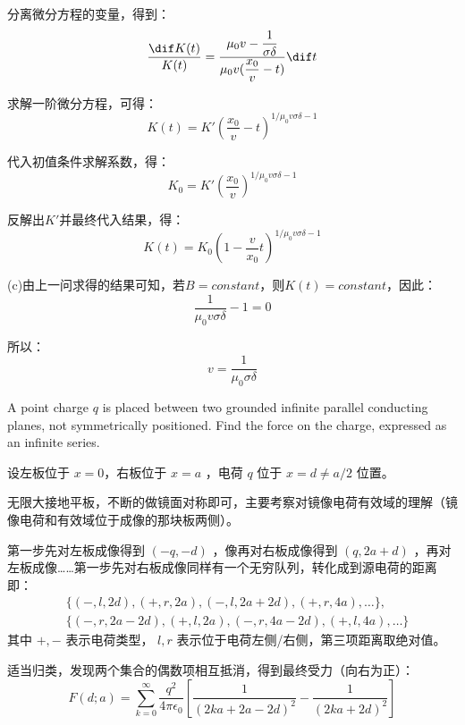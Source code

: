 \begin{solution}
    分离微分方程的变量，得到：
    \[\dfrac{\dif K(t)}{K(t)} = \dfrac{\mu_0 v - \dfrac{1}{\sigma \delta}}{\mu_0v(\dfrac{x_0}{v} - t)}\dif t\]

    求解一阶微分方程，可得：
    \[K(t) = K'(\dfrac{x_0}{v} - t)^{1/\mu_0 v \sigma\delta -1}\]

    代入初值条件求解系数，得：
    \[K_0 = K'(\dfrac{x_0}{v})^{1/\mu_0 v \sigma\delta -1}\]

    反解出$K'$并最终代入结果，得：
    \[K(t) = K_0(1-\dfrac{v}{x_0}t)^{1/\mu_0 v \sigma\delta -1}\]

    (c)由上一问求得的结果可知，若$B = constant$，则$K(t) = constant$，因此：
    \[\dfrac{1}{\mu_0 v \sigma\delta} - 1 = 0\]

    所以：
    \[v = \dfrac{1}{\mu_0 \sigma\delta}\]
\end{solution}

\begin{solution}
    A point charge \(q\) is placed between two grounded infinite parallel conducting planes, not symmetrically positioned. Find the force on the charge, expressed as an infinite series.
\tcbrule

    设左板位于 \(x=0\)，右板位于 \(x=a\) ，电荷 \(q\) 位于 \(x=d\neq a/2\) 位置。

    无限大接地平板，不断的做镜面对称即可，主要考察对镜像电荷有效域的理解（镜像电荷和有效域位于成像的那块板两侧）。

    第一步先对左板成像得到 \((-q,-d)\) ，像再对右板成像得到 \((q,2a+d)\) ，再对左板成像……第一步先对右板成像同样有一个无穷队列，转化成到源电荷的距离即：
    \begin{align}
    &\{(-,l,2d),(+,r,2a),(-,l,2a+2d),(+,r,4a),\dots\},\\
    &\{(-,r,2a-2d),(+,l,2a),(-,r,4a-2d),(+,l,4a),\dots\}
    \end{align}
    其中 \(+,-\) 表示电荷类型， \(l,r\) 表示位于电荷左侧/右侧，第三项距离取绝对值。

    适当归类，发现两个集合的偶数项相互抵消，得到最终受力（向右为正）：
    \[
        F(d;a)=\sum_{k=0}^\infty \frac{q^2}{4\pi \epsilon_0} [\frac{1}{(2ka+2a-2d)^2}-\frac{1}{(2ka+2d)^2}]
    \]
\end{solution}

